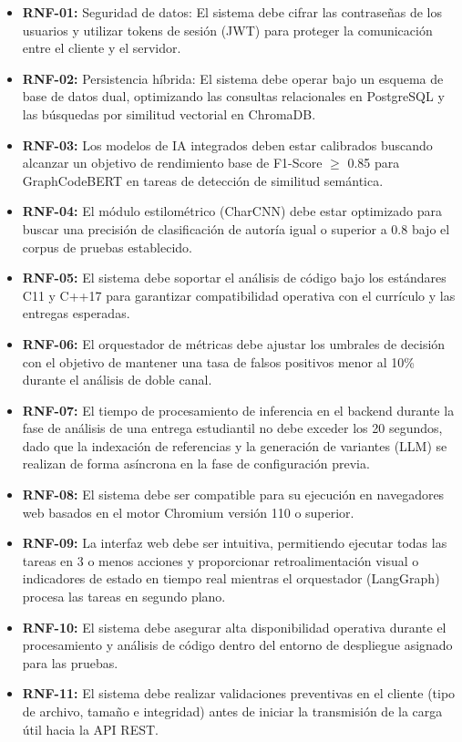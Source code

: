 \begin{itemize}
	\item \textbf{RNF-01:} Seguridad de datos: El sistema debe cifrar las contraseñas de los usuarios y utilizar tokens de sesión (JWT) para proteger la comunicación entre el cliente y el servidor.

	\item \textbf{RNF-02:} Persistencia híbrida: El sistema debe operar bajo un esquema de base de datos dual, optimizando las consultas relacionales en PostgreSQL y las búsquedas por similitud vectorial en ChromaDB.

	\item \textbf{RNF-03:} Los modelos de IA integrados deben estar calibrados buscando alcanzar un objetivo de rendimiento base de F1-Score $\ge$ 0.85 para GraphCodeBERT en tareas de detección de similitud semántica.

	\item \textbf{RNF-04:} El módulo estilométrico (CharCNN) debe estar optimizado para buscar una precisión de clasificación de autoría igual o superior a 0.8 bajo el corpus de pruebas establecido.

	\item \textbf{RNF-05:} El sistema debe soportar el análisis de código bajo los estándares C11 y C++17 para garantizar compatibilidad operativa con el currículo y las entregas esperadas.

	\item \textbf{RNF-06:} El orquestador de métricas debe ajustar los umbrales de decisión con el objetivo de mantener una tasa de falsos positivos menor al 10\% durante el análisis de doble canal.

	\item \textbf{RNF-07:} El tiempo de procesamiento de inferencia en el backend durante la fase de análisis de una entrega estudiantil no debe exceder los 20 segundos, dado que la indexación de referencias y la generación de variantes (LLM) se realizan de forma asíncrona en la fase de configuración previa.

	\item \textbf{RNF-08:} El sistema debe ser compatible para su ejecución en navegadores web basados en el motor Chromium versión 110 o superior.

	\item \textbf{RNF-09:} La interfaz web debe ser intuitiva, permitiendo ejecutar todas las tareas en 3 o menos acciones y proporcionar retroalimentación visual o indicadores de estado en tiempo real mientras el orquestador (LangGraph) procesa las tareas en segundo plano.

	\item \textbf{RNF-10:} El sistema debe asegurar alta disponibilidad operativa durante el procesamiento y análisis de código dentro del entorno de despliegue asignado para las pruebas.

	\item \textbf{RNF-11:} El sistema debe realizar validaciones preventivas en el cliente (tipo de archivo, tamaño e integridad) antes de iniciar la transmisión de la carga útil hacia la API REST.
\end{itemize}

